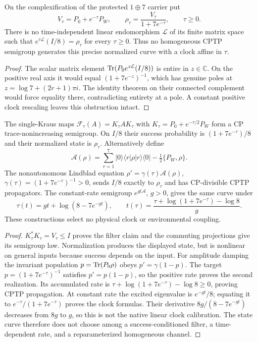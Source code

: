 \documentclass[12pt,a4paper]{article}
\begin{document}
\begin{theorem}
\label{p3c:thm:v2216-visibility-generator}
On the complexification of the protected $1\oplus7$ carrier put
\[
 V_\tau=P_0+e^{-\tau}P_W,\qquad
 \rho_\tau=\frac{V_\tau}{1+7e^{-\tau}},\qquad \tau\ge0.
\]
There is no time-independent linear endomorphism $\mathcal L$ of its
finite matrix space such that $e^{\tau\mathcal L}(I/8)=\rho_\tau$
for every $\tau\ge0$.  Thus no homogeneous CPTP semigroup generates
this precise normalized curve with a clock affine in $\tau$.
\end{theorem}
\begin{proof}
The scalar matrix element
$\operatorname{Tr}(P_0e^{z\mathcal L}(I/8))$ is entire in $z\in\mathbb C$.
On the positive real axis it would equal $(1+7e^{-z})^{-1}$,
which has genuine poles at $z=\log7+(2r+1)\pi i$.
The identity theorem on their connected complement would force equality
there, contradicting entirety at a pole.  A constant positive clock
rescaling leaves this obstruction intact.
\end{proof}

\begin{proposition}
\label{p3c:prop:v2216-visibility-realizations}
The single-Kraus maps $\mathcal F_\tau(A)=K_\tau A K_\tau$ with
$K_\tau=P_0+e^{-\tau/2}P_W$ form a CP trace-nonincreasing
semigroup.  On $I/8$ their success probability is
$(1+7e^{-\tau})/8$ and their normalized state is $\rho_\tau$.
Alternatively define
\[
 \mathcal A(\rho)=\sum_{r=1}^7|0\rangle\langle r|\rho
                    |r\rangle\langle0|-\tfrac12\{P_W,\rho\}.
\]
The nonautonomous Lindblad equation
$\rho'=\gamma(\tau)\mathcal A(\rho)$,
$\gamma(\tau)=(1+7e^{-\tau})^{-1}>0$, sends $I/8$ exactly to
$\rho_\tau$ and has CP-divisible CPTP propagators.  The constant-rate
semigroup $e^{gt\mathcal A}$, $g>0$, gives the same curve under
\[
 \tau(t)=gt+\log(8-7e^{-gt}),\qquad
 t(\tau)=\frac{\tau+\log(1+7e^{-\tau})-\log8}{g}.
\]
These constructions select no physical clock or environmental coupling.
\end{proposition}
\begin{proof}
$K_\tau^*K_\tau=V_\tau\le I$ proves the filter claim and the
commuting projections give its semigroup law.  Normalization produces
the displayed state, but is nonlinear on general inputs because success
depends on the input.  For amplitude damping the invariant population
$p=\operatorname{Tr}(P_0\rho)$ obeys $p'=\gamma(1-p)$.
The target $p=(1+7e^{-\tau})^{-1}$ satisfies $p'=p(1-p)$,
so the positive rate proves the second realization.  Its accumulated
rate is $\tau+\log(1+7e^{-\tau})-\log8\ge0$, proving CPTP
propagation.  At constant rate the excited eigenvalue is $e^{-gt}/8$;
equating it to $e^{-\tau}/(1+7e^{-\tau})$ proves the clock formulas.
Their derivative $8g/(8-7e^{-gt})$ decreases from $8g$ to $g$, so this
is not the native linear clock calibration.  The state curve therefore
does not choose among a success-conditioned filter, a time-dependent
rate, and a reparameterized homogeneous channel.
\end{proof}
\end{document}
